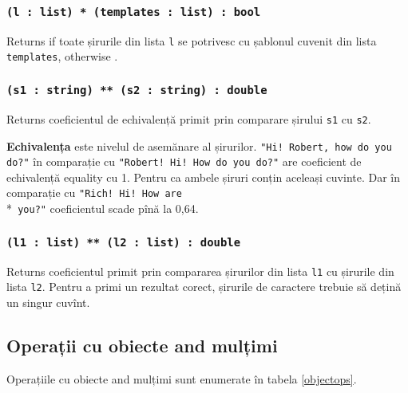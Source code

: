 \subsubsection{\texttt{(l : list) * (templates : list) : bool}}

Returns \true{} if toate șirurile din lista \texttt{l} se potrivesc cu șablonul cuvenit din lista \texttt{templates}, otherwise \false{}.

\subsubsection{\texttt{(s1 : string) ** (s2 : string) : double}}

Returns coeficientul de echivalență primit prin comparare șirului \texttt{s1} cu \texttt{s2}.

{\bf Echivalența} este nivelul de asemănare al șirurilor. \texttt{"Hi! Robert, how do you do?"} în comparație cu \texttt{"Robert! Hi! How do you do?"} are coeficient de echivalență equality cu 1. Pentru ca ambele șiruri conțin aceleași cuvinte. Dar în comparație cu  \texttt{"Rich! Hi! How are}\\*\texttt{ you?"} coeficientul scade pînă la 0,64.

\subsubsection{\texttt{(l1 : list) ** (l2 : list) : double}}

Returns coeficientul primit prin compararea șirurilor din lista \texttt{l1} cu șirurile din lista \texttt{l2}.
Pentru a primi un rezultat corect, șirurile de caractere trebuie să dețină un singur cuvînt.

\subsection{Operații cu obiecte and mulțimi}

Operațiile cu obiecte and mulțimi sunt enumerate în tabela \ref{objectops}.

